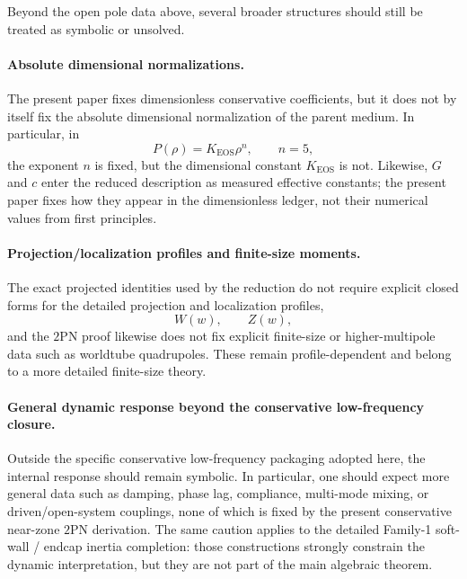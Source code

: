 \documentclass[11pt]{article}
\newcommand{\TwoPN}{\mathrm{2PN}}
\newcommand{\Wproj}{W}
\newcommand{\Zloc}{Z}
\newcommand{\KEOS}{K_{\mathrm{EOS}}}
\begin{document}
Beyond the open pole data above, several broader structures should still be treated as
symbolic or unsolved.

\paragraph{Absolute dimensional normalizations.}
The present paper fixes dimensionless conservative coefficients, but it does not by itself
fix the absolute dimensional normalization of the parent medium.
In particular, in
\begin{equation}
P(\rho)=\KEOS\rho^n,
\qquad n=5,
\label{eq:status-symbolic-keos}
\end{equation}
the exponent \(n\) is fixed, but the dimensional constant \(\KEOS\) is not.
Likewise, \(G\) and \(c\) enter the reduced description as measured effective constants;
the present paper fixes how they appear in the dimensionless ledger, not their numerical
values from first principles.

\paragraph{Projection/localization profiles and finite-size moments.}
The exact projected identities used by the reduction do not require explicit closed forms
for the detailed projection and localization profiles,
\begin{equation}
\Wproj(w),
\qquad
\Zloc(w),
\label{eq:status-symbolic-profiles}
\end{equation}
and the \(\TwoPN\) proof likewise does not fix explicit finite-size or higher-multipole
data such as worldtube quadrupoles.  These remain profile-dependent and belong to a more
detailed finite-size theory.

\paragraph{General dynamic response beyond the conservative low-frequency closure.}
Outside the specific conservative low-frequency packaging adopted here, the internal
response should remain symbolic.  In particular, one should expect more general data such
as damping, phase lag, compliance, multi-mode mixing, or driven/open-system couplings,
none of which is fixed by the present conservative near-zone \(\TwoPN\) derivation.
The same caution applies to the detailed Family-1 soft-wall / endcap inertia completion:
those constructions strongly constrain the dynamic interpretation, but they are not part
of the main algebraic theorem.
\end{document}
